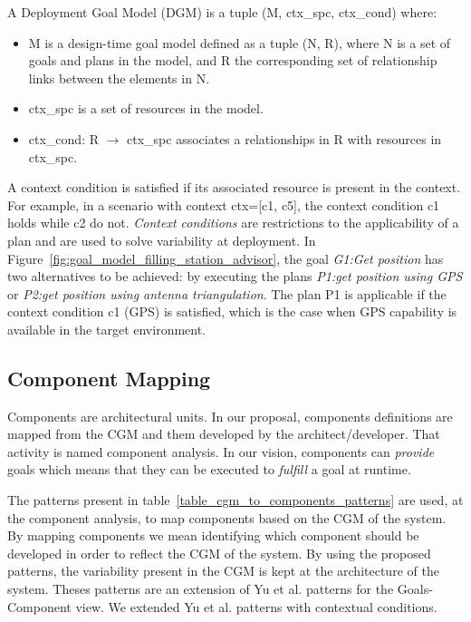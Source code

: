 \begin{defn}

  A Deployment Goal Model (DGM) is a tuple (M, ctx\_spc, ctx\_cond) where:

  \begin{itemize}
    \item M is a design-time goal model\cite{dalpiaz_runtime_2013} defined as a tuple (N, R), where N is a set of goals and plans in the model, and R the corresponding set of relationship links between the elements in N.

    \item ctx\_spc is a set of resources in the model.

    \item ctx\_cond: R $\to$ ctx\_spc associates a relationships in R with resources in  ctx\_spc.
  \end{itemize}

\end{defn}

A context condition is satisfied if its associated resource is present in the context. For example, in a scenario with context ctx=[c1, c5], the context condition c1 holds while c2 do not.
\emph{Context conditions} are restrictions to the applicability of a plan and are used to solve variability at deployment. In Figure~\ref{fig:goal_model_filling_station_advisor}, the goal \emph{G1:Get position} has two alternatives to be achieved: by executing the plans \emph{P1:get position using GPS}  or \emph{P2:get position using antenna triangulation}. The plan P1 is applicable if the context condition c1 (GPS) is satisfied, which is the case when GPS capability is available in the target environment.

\subsection{Component Mapping}
\label{sec:goals_components}

Components are architectural units. In our proposal, components definitions are mapped from the CGM and them developed by the architect/developer. That activity is named component analysis. In our vision, components can \emph{provide} goals which means that they can be executed to \emph{fulfill} a goal at runtime.

The patterns present in table~\ref{table_cgm_to_components_patterns} are used, at the component analysis, to map components based on the CGM of the system. By mapping components we mean identifying which component should be developed in order to reflect the CGM of the system. By using the proposed patterns, the variability present in the CGM is kept at the architecture of the system. Theses patterns are an extension of Yu et al.\cite{yu_goals_2008} patterns for the Goals-Component view. We extended Yu et al.\cite{yu_goals_2008} patterns with contextual conditions.

